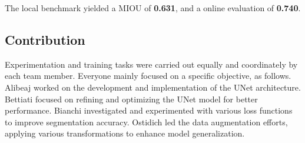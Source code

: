 \documentclass[11pt]{article}
\begin{document}
\begin{multicols}{2}
        The local benchmark yielded a MIOU of \textbf{0.631}, and a online evaluation of \textbf{0.740}.        \subsection{Contribution}

        Experimentation and training tasks were carried out equally and coordinately by each team member.
        Everyone mainly focused on a specific objective, as follows.
        Alibeaj worked on the development and implementation of the UNet architecture.
        Bettiati focused on refining and optimizing the UNet model for better performance.
        Bianchi investigated and experimented with various loss functions to improve segmentation accuracy.
        Ostidich led the data augmentation efforts, applying various transformations to enhance model generalization.

        
        

    \end{multicols}
\end{document}
